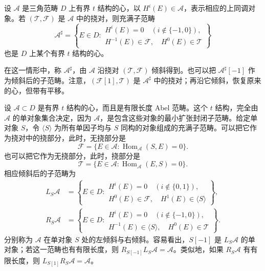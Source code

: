 \begin{proposition}\label{prop:4.58}
设 $\mathcal{A}$ 是三角范畴 $D$ 上有界 $t$ 结构的心，以 $H^i(E)\in\mathcal{A}$，表示相应的上同调对象。若 $(\mathcal{T},\mathcal{F})$ 是 $\mathcal{A}$ 中的挠对，则充满子范畴
\[
\mathcal{A}^{\sharp}
=\left\{E\in D:\begin{array}{l}
H^i(E)=0\quad(i\notin\{-1,0\}),\\
H^{-1}(E)\in\mathcal{F},\quad H^0(E)\in\mathcal{T}
\end{array}\right\}
\]
也是 $D$ 上某个有界 $t$ 结构的心。
\end{proposition}

在这一情形中，称 $\mathcal{A}^{\sharp}$，由 $\mathcal{A}$ 沿挠对 $(\mathcal{T},\mathcal{F})$ 倾斜得到。也可以把 $\mathcal{A}^{\sharp}[-1]$ 作为倾斜后的子范畴。注意，$(\mathcal{F}[1],\mathcal{T})$ 是 $\mathcal{A}^{\sharp}$ 中的挠对；再沿它倾斜，恢复原来的心，但带有平移。

设 $\mathcal{A}\subset D$ 是有界 $t$ 结构的心，而且是有限长度 Abel 范畴。这个 $t$ 结构，完全由 $\mathcal{A}$ 的单对象集合决定，因为 $\mathcal{A}$，是包含这些对象的最小扩张封闭子范畴。给定单对象 $S$，令 $\langle S\rangle$ 为所有单因子均与 $S$ 同构的对象组成的充满子范畴。可以把它作为挠对中的挠部分，此时，无挠部分是
\[
\mathcal{F}=\{E\in\mathcal{A}:\operatorname{Hom}_{\mathcal{A}}(S,E)=0\}.
\]
也可以把它作为无挠部分，此时，挠部分是
\[
\mathcal{T}=\{E\in\mathcal{A}:\operatorname{Hom}_{\mathcal{A}}(E,S)=0\}.
\]
相应倾斜后的子范畴为
\[
\begin{aligned}
L_S\mathcal{A}&=\left\{E\in D:\begin{array}{l}
H^i(E)=0\quad(i\notin\{0,1\}),\\
H^0(E)\in\mathcal{F},\quad H^1(E)\in\langle S\rangle
\end{array}\right\},\\
R_S\mathcal{A}&=\left\{E\in D:\begin{array}{l}
H^i(E)=0\quad(i\notin\{-1,0\}),\\
H^{-1}(E)\in\langle S\rangle,\quad H^0(E)\in\mathcal{T}
\end{array}\right\}.
\end{aligned}
\]
分别称为 $\mathcal{A}$ 在单对象 $S$ 处的左倾斜与右倾斜。容易看出，$S[-1]$ 是 $L_S\mathcal{A}$ 的单对象；若这一范畴也有有限长度，则 $R_{S[-1]}L_S\mathcal{A}=\mathcal{A}$。类似地，如果 $R_S\mathcal{A}$ 有有限长度，则 $L_{S[1]}R_S\mathcal{A}=\mathcal{A}$。


